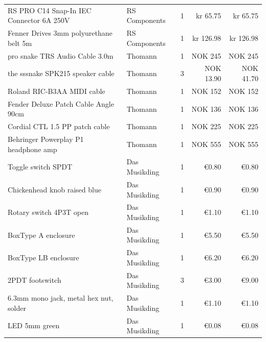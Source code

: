\begin{longtable}{p{7cm} l r r r}
	RS PRO C14 Snap-In IEC Connector 6A 250V           & RS Components     & 1            & kr 65.75            & kr 65.75       \\
	Fenner Drives 3mm polyurethane belt 5m             & RS Components     & 1            & kr 126.98           & kr 126.98      \\
	pro snake TRS Audio Cable 3.0m                     & Thomann           & 1            & NOK 245             & NOK 245        \\
	the sssnake SPK215 speaker cable                   & Thomann           & 3            & NOK 13.90           & NOK 41.70      \\
	Roland RIC-B3AA MIDI cable                         & Thomann           & 1            & NOK 152             & NOK 152        \\
	Fender Deluxe Patch Cable Angle 90cm               & Thomann           & 1            & NOK 136             & NOK 136        \\
	Cordial CTL 1.5 PP patch cable                     & Thomann           & 1            & NOK 225             & NOK 225        \\
	Behringer Powerplay P1 headphone amp               & Thomann           & 1            & NOK 555             & NOK 555        \\
	Toggle switch SPDT                                 & Das Musikding     & 1            & €0.80               & €0.80          \\
	Chickenhead knob raised blue                       & Das Musikding     & 1            & €0.90               & €0.90          \\
	Rotary switch 4P3T open                            & Das Musikding     & 1            & €1.10               & €1.10          \\
	BoxType A enclosure                                & Das Musikding     & 1            & €5.50               & €5.50          \\
	BoxType LB enclosure                               & Das Musikding     & 1            & €6.20               & €6.20          \\
	2PDT footswitch                                    & Das Musikding     & 3            & €3.00               & €9.00          \\
	6.3mm mono jack, metal hex nut, solder             & Das Musikding     & 1            & €1.10               & €1.10          \\
	LED 5mm green                                      & Das Musikding     & 1            & €0.08               & €0.08          \\

\end{longtable}
